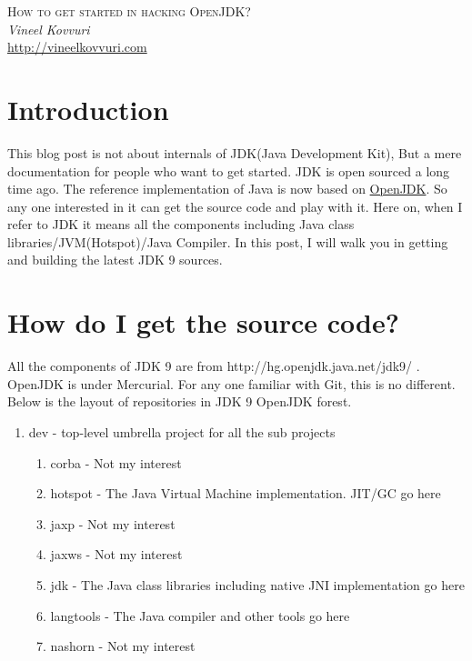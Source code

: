 \documentclass{article}
\begin{document}
\begin{titlepage}
   \begin{center}
      \Large\textsc{How to get started in hacking OpenJDK?}\\
      \vspace{5mm}
      \Large\textit{Vineel Kovvuri}\\
      \url{http://vineelkovvuri.com}\\
   \end{center}
\end{titlepage}

\tableofcontents

\newpage
\section{Introduction}
This blog post is not about internals of JDK(Java Development Kit), But a mere documentation for people who want to get started. JDK is open sourced a long time ago. The reference implementation of Java is now based on \href{http://openjdk.java.net/}{OpenJDK}. So any one interested in it can get the source code and play with it. Here on, when I refer to JDK it means all the components including Java class libraries/JVM(Hotspot)/Java Compiler. In this post, I will walk you in getting and building the latest JDK 9 sources.

\section{How do I get the source code?}
All the components of JDK 9 are from http://hg.openjdk.java.net/jdk9/ . OpenJDK is under Mercurial. For any one familiar with Git, this is no different. Below is the layout of repositories in JDK 9 OpenJDK forest.


\begin{enumerate}[noitemsep]
\item dev - top-level umbrella project for all the sub projects
    \begin{enumerate}[noitemsep]
    \item corba - Not my interest
    \item hotspot - The Java Virtual Machine implementation. JIT/GC go here
    \item jaxp - Not my interest
    \item jaxws - Not my interest
    \item jdk - The Java class libraries including native JNI implementation go here
    \item langtools - The Java compiler and other tools go here
    \item nashorn - Not my interest
    \end{enumerate}
\end{enumerate}
\end{document}
